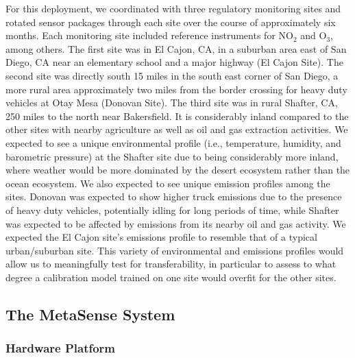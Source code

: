 \documentclass[journal abbreviation, manuscript]{copernicus}
\newcommand{\textus}[1]{$_{\text{#1}}$}
\begin{document}
For this deployment, we coordinated with three regulatory monitoring sites and rotated sensor packages through each site over the course of approximately six months. Each monitoring site included reference instruments for NO\textus{2} and O\textus{3}, among others. The first site was in El Cajon, CA, in a suburban area east of San Diego, CA near an elementary school and a major highway (El Cajon Site). The second site was directly south 15 miles in the south east corner of San Diego, a more rural area approximately two miles from the border crossing for heavy duty vehicles at Otay Mesa (Donovan Site). The third site was in rural Shafter, CA, 250 miles to the north near Bakersfield.  It is considerably inland compared to the other sites with nearby agriculture as well as oil and gas extraction activities. We expected to see a unique environmental profile (i.e., temperature, humidity, and barometric pressure) at the Shafter site due to being considerably more inland, where weather would be more dominated by the desert ecosystem rather than the ocean ecosystem.  We also expected to see unique emission profiles among the sites.  Donovan was expected to show higher truck emissions due to the presence of heavy duty vehicles, potentially idling for long periods of time, while Shafter was expected to be affected by emissions from its nearby oil and gas activity. We expected the El Cajon site's emissions profile to resemble that of a typical urban/suburban site.  This variety of environmental and emissions profiles would allow us to meaningfully test for transferability, in particular to assess to what degree a calibration model trained on one site would overfit for the other sites.

\subsection{The MetaSense System}

\subsubsection{Hardware Platform}
\end{document}
